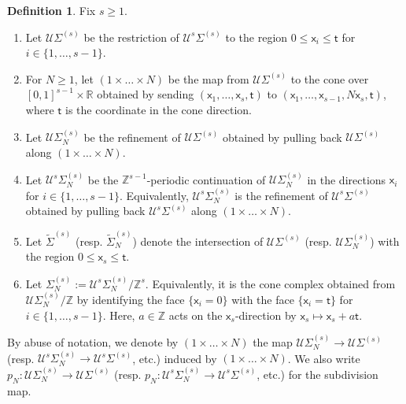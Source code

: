 \documentclass[11pt]{article}
\theoremstyle{definition}
\newtheorem{definition}{Definition}[section]
\begin{document}
\begin{definition}\label{def:cone_complexes}
	Fix $s\ge 1$.
	\begin{enumerate}[label = (\alph*)]
		\item Let $\mathcal{U}\Sigma^{(s)}$ be the restriction of $\mathcal{U}^{s}\Sigma^{(s)}$ to the region $0\le \mathsf{x}_i\le \mathsf{t}$ for $i\in \{1,\dots,s-1\}$.
		\item For $N\ge 1$, let $(1\times\dots\times N)$ be the map from
			$\mathcal U\Sigma^{(s)}$ to the cone over $[0,1]^{s-1}\times
			\mathbb{R}$ obtained by sending
			$(\mathsf{x}_1,\dots,\mathsf{x}_s,\mathsf{t})$ to
			$(\mathsf{x}_1,\dots,\mathsf{x}_{s-1},N\mathsf{x}_s,\mathsf{t})$,
			where $\mathsf{t}$ is the coordinate in the cone direction.
		\item Let $\mathcal U\Sigma_N^{(s)}$ be the refinement of $\mathcal U\Sigma^{(s)}$ obtained by pulling back $\mathcal U\Sigma^{(s)}$
			along $(1\times\dots\times N)$.
		\item Let $\mathcal{U}^{s}\Sigma_N^{(s)}$ be the $\mathbb{Z}^{s-1}$-periodic continuation of
			$\mathcal{U}\Sigma_N^{(s)}$ in the directions $\mathsf{x}_i$ for $i\in \{1,\dots,s-1\}$. Equivalently, $\mathcal{U}^{s}\Sigma_N^{(s)}$
			is the refinement of $\mathcal{U}^{s}\Sigma^{(s)}$ obtained by pulling back $\mathcal{U}^{s}\Sigma^{(s)}$ along
			$(1\times\dots\times N)$.
		\item Let $\tilde{\Sigma}^{(s)}$ (resp. $\tilde{\Sigma}_N^{(s)}$) denote the intersection of $\mathcal{U}\Sigma^{(s)}$ (resp. $\mathcal{U}\Sigma_N^{(s)}$) with the region $0\le \mathsf{x}_s\le \mathsf{t}$.
		\item Let $\Sigma_N^{(s)}:=\mathcal{U}^{s}\Sigma_N^{(s)}/\mathbb{Z}^{s}$. Equivalently,
			it is the cone complex obtained from $\mathcal U\Sigma_N^{(s)}/\mathbb{Z}$ by identifying the
			face $\{\mathsf{x}_i=0\}$ with the face $\{\mathsf{x}_i=\mathsf{t}\}$ for $i\in \{1,\dots,s-1\}$. Here, $a\in \mathbb{Z}$ acts on the $\mathsf{x}_s$-direction by $\mathsf{x}_s\mapsto \mathsf{x}_s+a\mathsf{t}$.
	\end{enumerate}
	By abuse of notation, we denote by $(1\times\dots\times N)$ the map
	$\mathcal U\Sigma_N^{(s)}\to \mathcal U\Sigma^{(s)}$ (resp. $\mathcal{U}^{s}\Sigma_N^{(s)}\to \mathcal{U}^{s}\Sigma^{(s)}$, etc.)
	induced by $(1\times\dots\times N)$. We also write $p_N:\mathcal U\Sigma_N^{(s)}\to \mathcal U\Sigma^{(s)}$
	(resp. $p_N:\mathcal{U}^{s}\Sigma_N^{(s)}\to \mathcal{U}^{s}\Sigma^{(s)}$, etc.) for the subdivision map.
\end{definition}
\end{document}
